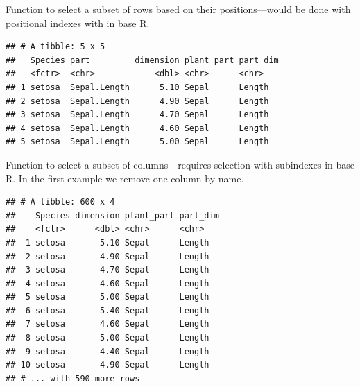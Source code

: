\documentclass[krantz2,ChapterTOCs]{krantz}\usepackage{knitr}
\begin{document}
Function  to select a subset of rows based on their positions---would be done with positional indexes with \code{[ , ]} in base R.

\begin{knitrout}\footnotesize
{}\color{fgcolor}\begin{kframe}
\begin{alltt}
 \hlopt{:}\hlstd{)}
\end{alltt}
\begin{verbatim}
## # A tibble: 5 x 5
##   Species part         dimension plant_part part_dim
##   <fctr>  <chr>            <dbl> <chr>      <chr>   
## 1 setosa  Sepal.Length      5.10 Sepal      Length  
## 2 setosa  Sepal.Length      4.90 Sepal      Length  
## 3 setosa  Sepal.Length      4.70 Sepal      Length  
## 4 setosa  Sepal.Length      4.60 Sepal      Length  
## 5 setosa  Sepal.Length      5.00 Sepal      Length
\end{verbatim}
\end{kframe}
\end{knitrout}

Function  to select a subset of columns---requires selection with subindexes in base R. In the first example we remove one column by name.

\begin{knitrout}\footnotesize
{}\color{fgcolor}\begin{kframe}
\begin{alltt}
 \hlopt{-}
\end{alltt}
\begin{verbatim}
## # A tibble: 600 x 4
##    Species dimension plant_part part_dim
##    <fctr>      <dbl> <chr>      <chr>   
##  1 setosa       5.10 Sepal      Length  
##  2 setosa       4.90 Sepal      Length  
##  3 setosa       4.70 Sepal      Length  
##  4 setosa       4.60 Sepal      Length  
##  5 setosa       5.00 Sepal      Length  
##  6 setosa       5.40 Sepal      Length  
##  7 setosa       4.60 Sepal      Length  
##  8 setosa       5.00 Sepal      Length  
##  9 setosa       4.40 Sepal      Length  
## 10 setosa       4.90 Sepal      Length  
## # ... with 590 more rows
\end{verbatim}
\end{kframe}
\end{knitrout}
\end{document}
